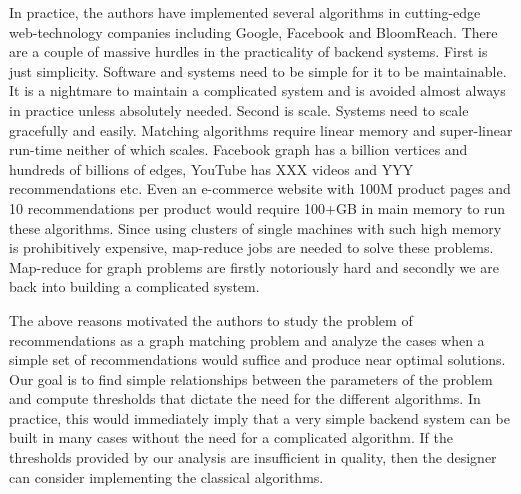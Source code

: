 In practice, the authors have implemented several algorithms in cutting-edge web-technology companies
including Google, Facebook and BloomReach. There are a couple of massive hurdles in the practicality
of backend systems. First is just simplicity. Software and systems need to be simple for it to be
maintainable. It is a nightmare to maintain a complicated system and is avoided almost always
in practice unless absolutely needed. Second is scale. Systems need to scale gracefully and easily. Matching
algorithms require linear memory and super-linear run-time neither of which scales. Facebook graph has
a billion vertices\cite{} and hundreds of billions of edges\cite{},
YouTube has XXX videos and YYY recommendations\cite{} etc. Even an e-commerce website with 100M product
pages and 10 recommendations per product would require 100+GB in main memory to run these algorithms. Since
using clusters of single machines with such high memory is prohibitively expensive, map-reduce\cite{} jobs
are needed to solve these problems. Map-reduce for graph problems are firstly notoriously hard and secondly
we are back into building a complicated system. \vs

The above reasons motivated the authors to study the problem of recommendations as a graph matching
problem and analyze the cases when a simple set of recommendations would suffice and produce near optimal
solutions. Our goal is to find simple relationships between the parameters of the problem and compute
thresholds that dictate the need for the different algorithms. In practice, this would immediately imply
that a very simple backend system can be built in many cases without the need for a complicated algorithm.
If the thresholds provided by our analysis are insufficient in quality,
then the designer can consider implementing the classical algorithms.


\fi